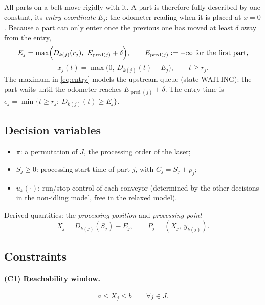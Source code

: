 \documentclass[11pt,a4paper]{article}
\theoremstyle{definition}
\theoremstyle{remark}
\newcommand{\pred}{\operatorname{pred}}
\begin{document}
All parts on a belt move rigidly with it. A part is therefore fully described by one
constant, its \emph{entry coordinate} $E_j$: the odometer reading when it is placed at
$x=0$. Because a part can only enter once the previous one has moved at least $\delta$
away from the entry,
\begin{equation}\label{eq:entry}
E_j=\max\Bigl(D_{k(j)}(r_j),\ E_{\pred(j)}+\delta\Bigr),\qquad E_{\pred(j)}:=-\infty\ \text{for the first part,}
\end{equation}
\begin{equation}\label{eq:pos}
x_j(t)=\max\bigl(0,\ D_{k(j)}(t)-E_j\bigr),\qquad t\ge r_j .
\end{equation}
The maximum in \eqref{eq:entry} models the upstream queue (state WAITING): the part
waits until the odometer reaches $E_{\pred(j)}+\delta$. The entry time is
$e_j=\min\{t\ge r_j:\ D_{k(j)}(t)\ge E_j\}$.

\subsection{Decision variables}
\begin{itemize}[nosep]
\item $\pi$: a permutation of $J$, the processing order of the laser;
\item $S_j\ge 0$: processing start time of part $j$, with $C_j=S_j+p_j$;
\item $u_k(\cdot)$: run/stop control of each conveyor (determined by the other
decisions in the non-idling model, free in the relaxed model).
\end{itemize}
Derived quantities: the \emph{processing position} and \emph{processing point}
\begin{equation}\label{eq:X}
X_j=D_{k(j)}(S_j)-E_j,\qquad P_j=(X_j,\ y_{k(j)}).
\end{equation}

\subsection{Constraints}

\paragraph{(C1) Reachability window.}
\begin{equation}\label{eq:C1}
a\le X_j\le b\qquad\forall j\in J.
\end{equation}
\end{document}
